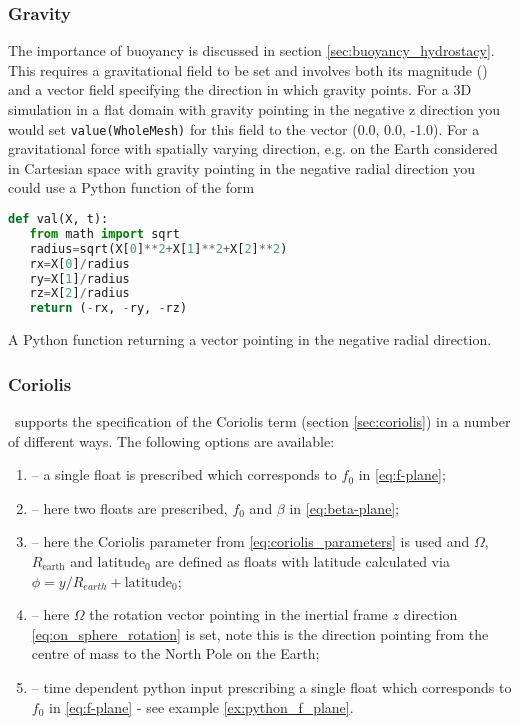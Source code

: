 \subsubsection{Gravity}\label{sec:Gravity}
The importance of buoyancy is discussed in section \ref{sec:buoyancy_hydrostacy}. This
requires a gravitational field to be set and involves both its magnitude
(\eg \mss[9.8]) and a vector field specifying the direction in which gravity
points. For a 3D simulation in a flat domain with gravity pointing in the
negative z direction you would set \verb+value(WholeMesh)+ for this field to
the vector (0.0, 0.0, -1.0). For a gravitational force with spatially
varying direction, e.g. on the Earth considered in Cartesian space with
gravity pointing in the negative radial direction you could use a Python
function of the form
\begin{example}
  \begin{lstlisting}[language=Python]
def val(X, t):
   from math import sqrt
   radius=sqrt(X[0]**2+X[1]**2+X[2]**2)
   rx=X[0]/radius
   ry=X[1]/radius
   rz=X[2]/radius
   return (-rx, -ry, -rz)
  \end{lstlisting}
  \caption{A Python function returning a vector pointing in the negative radial direction.}
\end{example}

\subsubsection{Coriolis}

\fluidity\ supports the specification of the Coriolis term (section
\ref{sec:coriolis}) in a number of different ways. The following options
are available:

\begin{enumerate}
  \item {} -- a single float is prescribed which corresponds to
        $f_0$ in \eqref{eq:f-plane};
  \item {} -- here two floats are prescribed, $f_0$ and
        $\beta$ in \eqref{eq:beta-plane};
  \item {} -- here the Coriolis parameter from
        \eqref{eq:coriolis_parameters} is used and $\Omega$, 
        $R_{\textrm{earth}}$ and $\textrm{latitude}_0$ are defined as floats with
        latitude calculated via 
        $\phi = y/R_{earth} + \textrm{latitude}_0$;
  \item {} -- here $\Omega$ the rotation vector pointing in the
        inertial frame $z$ direction  \eqref{eq:on_sphere_rotation} is set,
        note this is the direction pointing from the centre of mass to the North
        Pole on the Earth;
 \item {} -- time dependent python input
       prescribing a single float which corresponds to
       $f_0$ in \eqref{eq:f-plane} - see example \ref{ex:python_f_plane}.
\end{enumerate}


